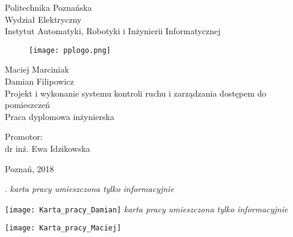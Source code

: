 \documentclass[twoside,10pt]{article}
\title{\TytulPolski}
\author{\StudentA}
\def\TytulPolski    {Projekt i wykonanie systemu kontroli ruchu i zarządzania dostępem do pomieszczeń}
\def\Promotor    {dr inż. Ewa Idzikowska}
\def\StudentA     {Maciej Marciniak}
\def\StudentB     {Damian Filipowicz}
\begin{document}
\thispagestyle{empty}
\setcounter{page}{0}
\begin{center}
\vspace{-10mm}
Politechnika Poznańska\\
Wydział Elektryczny\\  
Instytut Automatyki, Robotyki i Inżynierii Informatycznej\\
\vspace{8mm}
\begin{figure}[ht!]
\centering
\texttt{[image: pplogo.png]}
\end{figure}
\vspace{8mm}
\Large{\StudentA}\\
\Large{\StudentB}\\
\vspace{10mm}
\LARGE{\TytulPolski}\\
\vspace{10mm}
\Large{Praca dyplomowa inżynierska}\\
\end{center}
\vspace{40mm}
\begin{flushright}
{\large Promotor:\\
\Promotor}
\end{flushright}

\vspace{15mm}
\begin{center}
Poznań, 2018
\end{center}


\newpage
{\tiny .}
\thispagestyle{empty}
\setcounter{page}{0}
\newpage
\textit{karta pracy umieszczona tylko informacyjnie}

\texttt{[image: Karta\_pracy\_Damian]}
\newpage
\textit{karta pracy umieszczona tylko informacyjnie}

\texttt{[image: Karta\_pracy\_Maciej]}
\end{document}
